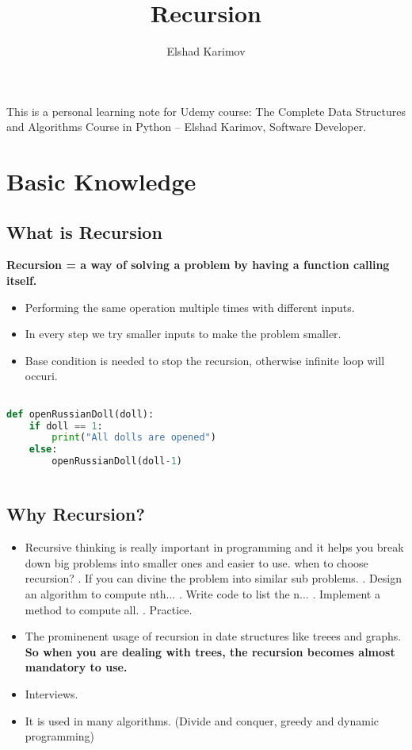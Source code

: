 \documentclass[10pt,letterpaper]{article}
\title{Recursion}
\author{Elshad Karimov}
\begin{document}
\begin{titlepage}
\maketitle
\end{titlepage}
This is a personal learning note for Udemy course: The Complete Data Structures and Algorithms Course in Python -- Elshad Karimov, Software Developer.

\section{Basic Knowledge}

\subsection{What is Recursion}
\textbf{Recursion = a way of solving a problem by having a function calling itself.}
\begin{itemize}
\item Performing the same operation multiple times with different inputs.
\item In every step we try smaller inputs to make the problem smaller.
\item Base condition is needed to stop the recursion, otherwise infinite loop will occuri.
\end{itemize}

\begin{lstlisting}[language=Python, caption=$1^{st}$ Standard Example]

def openRussianDoll(doll):
	if doll == 1:
		print("All dolls are opened")
	else:
		openRussianDoll(doll-1)
		
\end{lstlisting}


\subsection{Why Recursion?}
\begin{itemize}
\item Recursive thinking is really important in programming and it helps you break down big problems into smaller ones and easier to use.
	when to choose recursion?
	. If you can divine the problem into similar sub problems.
	. Design an algorithm to compute nth...
	. Write code to list the n...
	. Implement a method to compute all.
	. Practice.
\item The prominenent usage of recursion in date structures like treees and graphs. \\ \textbf{So when you are dealing with trees, the recursion becomes almost mandatory to use.}

\item Interviews.
\item It is used in many algorithms. (Divide and conquer, greedy and dynamic programming)
\end{itemize}
\end{document}

